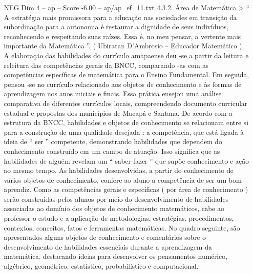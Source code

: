 \begin{textsample}{NEG Dim 4 – ap – Score -6.00 – ap/ap\_ef\_11.txt}  \label{ex:f4_neg_051}
4.3.2.
Área de Matemática > “ A estratégia mais promissora para a educação nas sociedades em transição da subordinação para a autonomia é restaurar a dignidade de seus indivíduos, reconhecendo e respeitando suas raízes.
Essa é, no meu pensar, a vertente mais importante da Matemática ”. ( Ubiratan D’Ambrosio – Educador Matemático ).
A elaboração das habilidades do currículo amapaense deu -se a partir da leitura e releitura das competências gerais da BNCC, comparando -as com as competências específicas de matemática para o Ensino Fundamental.
Em seguida, pensou -se no currículo relacionado aos objetos de conhecimento e às formas de aprendizagem nos anos iniciais e finais.
Essa prática ensejou uma análise comparativa de diferentes currículos locais, compreendendo documento curricular estadual e propostas dos municípios de Macapá e Santana.
De acordo com a estrutura da BNCC, habilidades e objetos de conhecimento se relacionam entre si para a construção de uma qualidade desejada : a competência, que está ligada à ideia de “ ser ” competente, demonstrando habilidades que dependem do conhecimento construído em um campo de atuação.
Isso significa que as habilidades de alguém revelam um “ saber-fazer ” que supõe conhecimento e ação ao mesmo tempo.
As habilidades desenvolvidas, a partir do conhecimento de vários objetos de conhecimento, confere ao aluno a competência de ser um bom aprendiz.
Como as competências gerais e específicas ( por área de conhecimento ) serão construídas pelos alunos por meio do desenvolvimento de habilidades associadas ao domínio dos objetos de conhecimento matemáticos, cabe ao professor o estudo e a aplicação de metodologias, estratégias, procedimentos, contextos, conceitos, fatos e ferramentas matemáticas.
No quadro seguinte, são apresentados alguns objetos de conhecimento e comentários sobre o desenvolvimento de habilidades essenciais durante a aprendizagem da matemática, destacando ideias para desenvolver os pensamentos numérico, algébrico, geométrico, estatístico, probabilístico e computacional.

\end{textsample}
